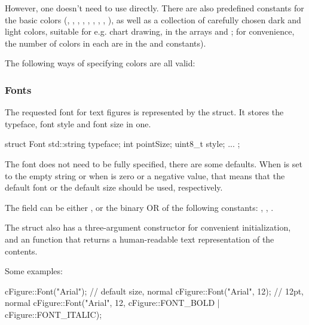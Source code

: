 However, one doesn't need to use  directly.
There are also predefined constants for the basic colors (,
, , , , , ,
, ), as well as a collection of carefully chosen
dark and light colors, suitable for e.g. chart drawing, in the arrays
 and ; for convenience,
the number of colors in each are in the 
and  constants).

The following ways of specifying colors are all valid:



\subsubsection{Fonts}
\label{sec:graphics:canvas-fonts}

The requested font for text figures is represented by the 
struct. It stores the typeface, font style and font size in one.

\begin{cpp}
struct Font {
    std::string typeface;
    int pointSize;
    uint8_t style;
    ...
};
\end{cpp}

The font does not need to be fully specified, there are some defaults. When
 is set to the empty string or when  is zero
or a negative value, that means that the default font or the default size
should be used, respectively.

The  field can be either , or the binary OR of
the following constants: , ,
.

The struct also has a three-argument constructor for convenient
initialization, and an  function that returns a human-readable
text representation of the contents.

Some examples:

\begin{cpp}
cFigure::Font("Arial");  // default size, normal
cFigure::Font("Arial", 12);  // 12pt, normal
cFigure::Font("Arial", 12, cFigure::FONT_BOLD | cFigure::FONT_ITALIC);
\end{cpp}


